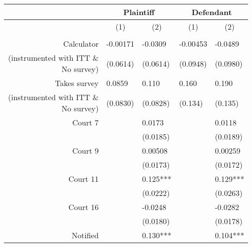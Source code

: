 \begin{tabular}{rrrrr}
\toprule
      & \multicolumn{2}{c}{Plaintiff} & \multicolumn{2}{c}{Defendant} \\
\midrule
      & \multicolumn{1}{c}{(1)} & \multicolumn{1}{c}{(2)} & \multicolumn{1}{c}{(1)} & \multicolumn{1}{c}{(2)} \\
      &       &       &       &  \\
Calculator & \multicolumn{1}{l}{-0.00171} & \multicolumn{1}{l}{-0.0309} & \multicolumn{1}{l}{-0.00453} & \multicolumn{1}{l}{-0.0489} \\
(instrumented with ITT \& No survey) & \multicolumn{1}{l}{(0.0614)} & \multicolumn{1}{l}{(0.0614)} & \multicolumn{1}{l}{(0.0948)} & \multicolumn{1}{l}{(0.0980)} \\
Takes survey & \multicolumn{1}{l}{0.0859} & \multicolumn{1}{l}{0.110} & \multicolumn{1}{l}{0.160} & \multicolumn{1}{l}{0.190} \\
(instrumented with ITT \& No survey) & \multicolumn{1}{l}{(0.0830)} & \multicolumn{1}{l}{(0.0828)} & \multicolumn{1}{l}{(0.134)} & \multicolumn{1}{l}{(0.135)} \\
Court 7 & \multicolumn{1}{l}{} & \multicolumn{1}{l}{0.0173} & \multicolumn{1}{l}{} & \multicolumn{1}{l}{0.0118} \\
      & \multicolumn{1}{l}{} & \multicolumn{1}{l}{(0.0185)} & \multicolumn{1}{l}{} & \multicolumn{1}{l}{(0.0189)} \\
Court 9 & \multicolumn{1}{l}{} & \multicolumn{1}{l}{0.00508} & \multicolumn{1}{l}{} & \multicolumn{1}{l}{0.00259} \\
      & \multicolumn{1}{l}{} & \multicolumn{1}{l}{(0.0173)} & \multicolumn{1}{l}{} & \multicolumn{1}{l}{(0.0172)} \\
Court 11 & \multicolumn{1}{l}{} & \multicolumn{1}{l}{0.125***} & \multicolumn{1}{l}{} & \multicolumn{1}{l}{0.129***} \\
      & \multicolumn{1}{l}{} & \multicolumn{1}{l}{(0.0222)} & \multicolumn{1}{l}{} & \multicolumn{1}{l}{(0.0263)} \\
Court 16 & \multicolumn{1}{l}{} & \multicolumn{1}{l}{-0.0248} & \multicolumn{1}{l}{} & \multicolumn{1}{l}{-0.0282} \\
      & \multicolumn{1}{l}{} & \multicolumn{1}{l}{(0.0180)} & \multicolumn{1}{l}{} & \multicolumn{1}{l}{(0.0178)} \\
Notified & \multicolumn{1}{l}{} & \multicolumn{1}{l}{0.130***} & \multicolumn{1}{l}{} & \multicolumn{1}{l}{0.104***} \\

\end{tabular}
